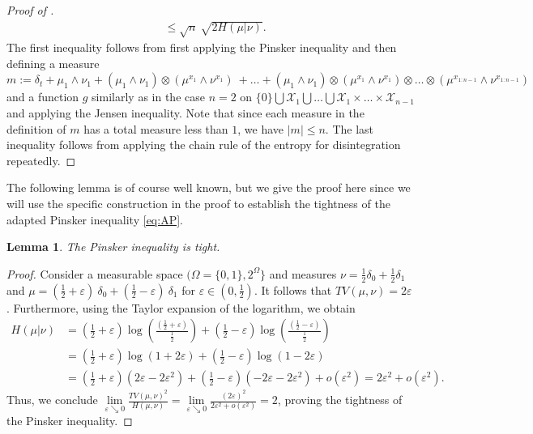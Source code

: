 \documentclass[10pt, A4paper]{amsart}
\newtheorem{lemma}[theorem]{Lemma}
\theoremstyle{definition}
\newcommand{\X}{\mathcal X}
\numberwithin{equation}{section}
\begin{document}
\begin{proof}[Proof of ]
\begin{align*}
        & \leq \sqrt{n} \ \sqrt{2 H(\mu|\nu)}.
    \end{align*}
    The first inequality follows from first applying the Pinsker inequality and then defining a measure $m:= \delta_{t} + \mu_1 \wedge \nu_1 + (\mu_1 \wedge \nu_1) \otimes (\mu^{x_1} \wedge \nu^{x_1}) \ + \ldots + (\mu_1 \wedge \nu_1) \otimes (\mu^{x_1} \wedge \nu^{x_1}) \otimes \ldots \otimes (\mu^{x_{1:n-1}} \wedge \nu^{x_{1:n-1}})$ and a function $g$ similarly as in the case $n=2$ on $\{0\} \bigcup \X_1 \bigcup \ldots \bigcup \X_1 \times \ldots \times \X_{n-1}$ and applying the Jensen inequality. Note that since each measure in the definition of $m$ has a total measure less than $1$, we have $|m| \leq n$. The last inequality follows from applying the chain rule of the entropy for disintegration repeatedly.
\end{proof}

The following lemma is of course well known, but we give the proof here since we will use the specific construction in the proof to establish the tightness of the adapted Pinsker inequality \eqref{eq:AP}.
\begin{lemma}\label{tightpinsker}
    The Pinsker inequality is tight.
\end{lemma}

\begin{proof}
    Consider a measurable space $(\Omega = \{0,1\},2^\Omega\}$ and measures $\nu = \frac{1}{2}\delta_0+\frac{1}{2}\delta_1$ and $\mu = (\frac{1}{2}+\varepsilon)\ \delta_0 + (\frac{1}{2}-\varepsilon)\ \delta_1$ for $\varepsilon \in \left(0,\frac{1}{2}\right)$. It follows that $TV(\mu,\nu)=2\varepsilon$. 
    Furthermore, using the Taylor expansion of the logarithm, we obtain 
    \begin{align*}\textstyle H(\mu|\nu) & = \textstyle (\frac{1}{2}+\varepsilon) \log\left(\frac{(\frac{1}{2}+\varepsilon)}{\frac{1}{2}}\right)+(\frac{1}{2}-\varepsilon)\log\left(\frac{(\frac{1}{2}-\varepsilon)}{\frac{1}{2}}\right)\\
    &= \textstyle (\frac{1}{2}+\varepsilon) \log(1+2\varepsilon)+(\frac{1}{2}-\varepsilon)\log(1-2\varepsilon) \\ & =  \textstyle (\frac{1}{2}+\varepsilon)(2\varepsilon-2\varepsilon^2)+(\frac{1}{2}-\varepsilon)(-2\varepsilon-2\varepsilon^2)+o(\varepsilon^2) \textstyle = 2\varepsilon^2 + o(\varepsilon^2).
    \end{align*}
    Thus, we conclude $\lim\limits_{\varepsilon \searrow 0} \frac{TV(\mu,\nu)^2}{H(\mu,\nu)}=\lim\limits_{\varepsilon \searrow 0} \frac{(2\varepsilon)^2}{2\varepsilon^2+o(\varepsilon^2)} =2$, proving the tightness of the Pinsker inequality.
\end{proof}
\end{document}
